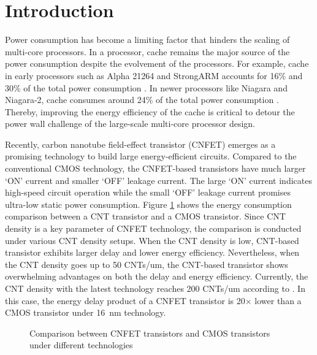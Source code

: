 \section{Introduction} \label{sec:intro}
Power consumption has become a limiting factor that hinders the scaling of 
multi-core processors. In a processor, cache remains the major source of 
the power consumption despite the evolvement of the processors. 
For example, cache in early processors such as Alpha 21264 and StrongARM 
accounts for 16\% and 30\% of the total power consumption 
\cite{mittal2014survey}. In newer processors like Niagara and Niagara-2, 
cache consumes around 24\% of the total power consumption \cite{li2009mcpat}.
Thereby, improving the energy efficiency of the cache is critical to detour 
the power wall challenge \cite{zang2013survey} of the large-scale multi-core 
processor design. 

Recently, carbon nanotube field-effect transistor (CNFET) emerges as a 
promising technology to build large energy-efficient circuits\cite{shulaker2013carbon,hills2019modern}.
Compared to the conventional CMOS technology, the CNFET-based transistors 
have much larger ‘ON’ current and smaller ‘OFF’ leakage current. 
The large ‘ON’ current indicates high-speed circuit operation 
while the small ‘OFF’ leakage current promises ultra-low static power 
consumption. Figure \ref{fig:EDP-advantage} shows the energy consumption 
comparison between a CNT transistor and a CMOS transistor. 
Since CNT density is a key parameter of CNFET technology, the 
comparison is conducted under various CNT density setups. 
When the CNT density is low, CNT-based 
transistor exhibits larger delay and lower energy efficiency.
Nevertheless, when the CNT density goes up to 50 CNTs/um, 
the CNT-based transistor shows overwhelming advantages on 
both the delay and energy efficiency. Currently, the CNT density with 
the latest technology reaches 200 CNTs/um according to 
\cite{deng2007carbon}. In this case, the energy delay product 
of a CNFET transistor is 20$\times$ lower than \cite{patil2008circuit,patil2009digital} 
a CMOS transistor under \SI{16}{\nm} technology.

\begin{figure}
	\center 
    \caption{Comparison between CNFET transistors and CMOS transistors under different technologies\cite{patil2008circuit,patil2009digital}}
\label{fig:EDP-advantage}
\vspace{-1em}
\end{figure}


